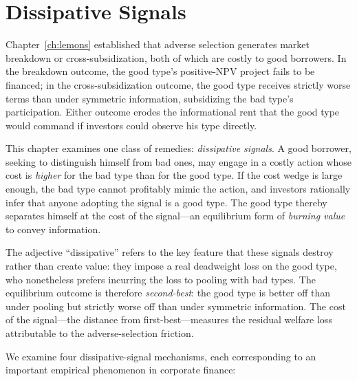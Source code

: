 \documentclass[11pt,a4paper,oneside]{book}
\theoremstyle{plain}
\theoremstyle{definition}
\theoremstyle{remark}
\numberwithin{equation}{chapter}
\begin{document}
\chapter{Dissipative Signals}
\label{ch:dissipative}

Chapter~\ref{ch:lemons} established that adverse selection generates market breakdown or cross-subsidization, both of which are costly to good borrowers.
In the breakdown outcome, the good type's positive-NPV project fails to be financed; in the cross-subsidization outcome, the good type receives strictly worse terms than under symmetric information, subsidizing the bad type's participation.
Either outcome erodes the informational rent that the good type would command if investors could observe his type directly.

This chapter examines one class of remedies: \emph{dissipative signals}.
A good borrower, seeking to distinguish himself from bad ones, may engage in a costly action whose cost is \emph{higher} for the bad type than for the good type.
If the cost wedge is large enough, the bad type cannot profitably mimic the action, and investors rationally infer that anyone adopting the signal is a good type.
The good type thereby separates himself at the cost of the signal---an equilibrium form of \emph{burning value} to convey information.

The adjective ``dissipative'' refers to the key feature that these signals destroy rather than create value: they impose a real deadweight loss on the good type, who nonetheless prefers incurring the loss to pooling with bad types.
The equilibrium outcome is therefore \emph{second-best}: the good type is better off than under pooling but strictly worse off than under symmetric information.
The cost of the signal---the distance from first-best---measures the residual welfare loss attributable to the adverse-selection friction.

We examine four dissipative-signal mechanisms, each corresponding to an important empirical phenomenon in corporate finance:
\end{document}
